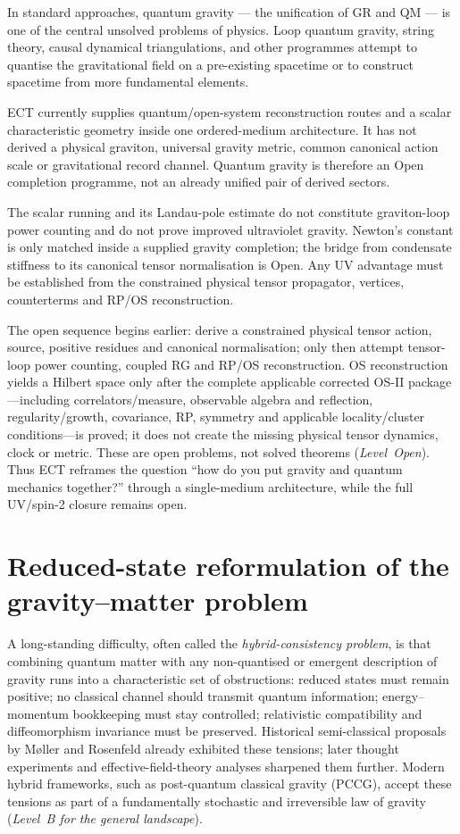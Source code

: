 \documentclass[11pt,a4paper]{article}
\begin{document}
In standard approaches, quantum gravity --- the unification of GR and QM --- is one of the central unsolved problems of physics. Loop quantum gravity, string theory, causal dynamical triangulations, and other programmes attempt to quantise the gravitational field on a pre-existing spacetime or to construct spacetime from more fundamental elements.

ECT currently supplies quantum/open-system reconstruction routes and a scalar characteristic geometry inside one ordered-medium architecture.  It has not derived a physical graviton, universal gravity metric, common canonical action scale or gravitational record channel.  Quantum gravity is therefore an Open completion programme, not an already unified pair of derived sectors.

The scalar running and its Landau-pole estimate do not constitute graviton-loop power counting and do not prove improved ultraviolet gravity.  Newton's constant is only matched inside a supplied gravity completion; the bridge from condensate stiffness to its canonical tensor normalisation is Open.  Any UV advantage must be established from the constrained physical tensor propagator, vertices, counterterms and RP/OS reconstruction.

The open sequence begins earlier: derive a constrained physical tensor action, source, positive residues and canonical normalisation; only then attempt tensor-loop power counting, coupled RG and RP/OS reconstruction. OS reconstruction yields a Hilbert space only after the complete applicable corrected OS-II package---including correlators/measure, observable algebra and reflection, regularity/growth, covariance, RP, symmetry and applicable locality/cluster conditions---is proved; it does not create the missing physical tensor dynamics, clock or metric. These are open problems, not solved theorems (\emph{Level~Open}). Thus ECT reframes the question ``how do you put gravity and quantum mechanics together?'' through a single-medium architecture, while the full UV/spin-2 closure remains open.


\section{Reduced-state reformulation of the gravity--matter problem}
\label{sec:pop_hybrid_consistency}

A long-standing difficulty, often called the \emph{hybrid-consistency problem},
is that combining quantum matter with any non-quantised or emergent
description of gravity runs into a characteristic set of obstructions:
reduced states must remain positive; no classical channel should
transmit quantum information; energy--momentum bookkeeping must stay
controlled; relativistic compatibility and diffeomorphism invariance
must be preserved. Historical semi-classical proposals by M{\o}ller
and Rosenfeld already exhibited these tensions; later thought
experiments and effective-field-theory analyses sharpened them further.
Modern hybrid frameworks, such as post-quantum classical gravity
(PCCG), accept these tensions as part of a fundamentally stochastic
and irreversible law of gravity (\emph{Level~B for the general
landscape}).
\end{document}
